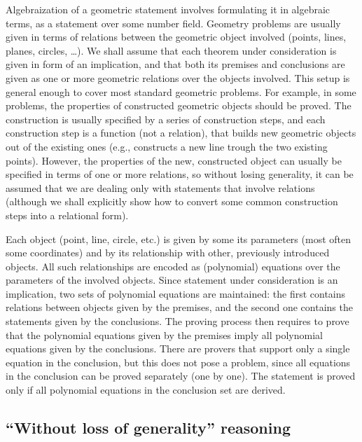 \documentclass[final,1p,times,authoryear]{elsarticle}
\begin{document}
Algebraization of a geometric statement involves formulating it in
algebraic terms, as a statement over some number field. Geometry
problems are usually given in terms of relations between the geometric
object involved (points, lines, planes, circles, \ldots). We shall
assume that each theorem under consideration is given in form of an
implication, and that both its premises and conclusions are given as
one or more geometric relations over the objects involved. This setup
is general enough to cover most standard geometric problems. For
example, in some problems, the properties of constructed geometric
objects should be proved. The construction is usually specified by a
series of construction steps, and each construction step is a function
(not a relation), that builds new geometric objects out of the
existing ones (e.g., constructs a new line trough the two existing
points). However, the properties of the new, constructed object can
usually be specified in terms of one or more relations, so without
losing generality, it can be assumed that we are dealing only with
statements that involve relations (although we shall explicitly show
how to convert some common construction steps into a relational form).

Each object (point, line, circle, etc.) is given by some its
parameters (most often some coordinates) and by its relationship with
other, previously introduced objects. All such relationships are
encoded as (polynomial) equations over the parameters of the involved
objects. Since statement under consideration is an implication, two
sets of polynomial equations are maintained: the first contains
relations between objects given by the premises, and the second one
contains the statements given by the conclusions. The proving process
then requires to prove that the polynomial equations given by the
premises imply all polynomial equations given by the conclusions.
There are provers that support only a single equation in the
conclusion, but this does not pose a problem, since all equations in
the conclusion can be proved separately (one by one). The statement is
proved only if all polynomial equations in the conclusion set are
derived.

\subsection{``Without loss of generality'' reasoning}
\end{document}
